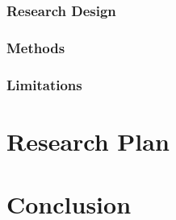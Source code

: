 \documentclass[a4paper,twoside,12pt]{report}
\begin{document}
\subsection{Research Design}

\subsection{Methods}

\subsection{Limitations}

\chapter{Research Plan} \label{ch:plan}

\chapter{Conclusion} \label{ch:conclusion}

\nocite{*}


\end{document}
